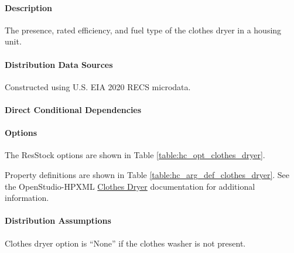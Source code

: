 \paragraph{Description}
% 
The presence, rated efficiency, and fuel type of the clothes dryer in a housing unit.

\paragraph{Distribution Data Sources}
% 
Constructed using U.S. EIA 2020 RECS microdata. 

\paragraph{Direct Conditional Dependencies}


\paragraph{Options}
The ResStock options are shown in Table \ref{table:hc_opt_clothes_dryer}.



Property definitions are shown in Table \ref{table:hc_arg_def_clothes_dryer}. See the OpenStudio-HPXML \href{https://openstudio-hpxml.readthedocs.io/en/v1.10.0/workflow_inputs.html#hpxml-clothes-dryer}{Clothes Dryer} documentation for additional information.



\paragraph{Distribution Assumptions}
% 
Clothes dryer option is ``None'' if the clothes washer is not present.


